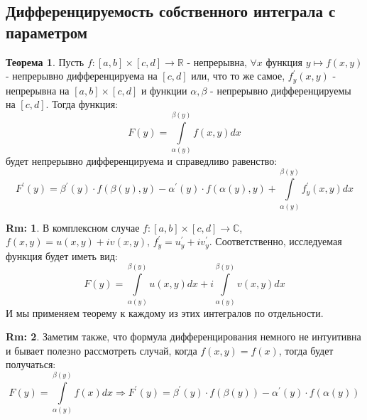 \documentclass[12pt]{article}
\newcommand{\MR}{\mathbb{R}}
\newcommand{\MC}{\mathbb{C}}
\theoremstyle{definition}
\newtheorem{rem}{Rm:}
\newtheorem{theorem}{Теорема}
\newcommand{\ddint}[2]{\displaystyle\int\limits_{#1}^{#2}}
\begin{document}
\subsection*{Дифференцируемость собственного интеграла с параметром}
\begin{theorem}
	Пусть $f\colon [a,b]\times[c,d]\to \MR$ - непрерывна, $\forall x$ функция $y \mapsto f(x,y)$ - непрерывно дифференцируема на $[c,d]$ или, что то же самое, $f_y^\prime(x,y)$ - непрерывна на $[a,b] \times [c,d]$ и функции $\alpha, \beta$ - непрерывно дифференцируемы на $[c,d]$. Тогда функция: 
	$$
		F(y) = \ddint{\alpha(y)}{\beta(y)}f(x,y)dx
	$$
	будет непрерывно дифференцируема и справедливо равенство:
	$$
		F^\prime(y) = \beta^\prime(y) {\cdot}f(\beta(y),y) - \alpha^\prime(y){\cdot}f(\alpha(y),y) + \ddint{\alpha(y)}{\beta(y)}f_y^\prime(x,y)dx
	$$
\end{theorem}
\begin{rem}
	В комплексном случае $f\colon [a,b]\times[c,d]\to \MC$, $f(x,y) = u(x,y) + i v(x,y), \, f_y^\prime = u_y^\prime + i v_y^\prime$. Соответственно, исследуемая функция будет иметь вид:
	$$
		F(y) = \ddint{\alpha(y)}{\beta(y)}u(x,y)dx + i \ddint{\alpha(y)}{\beta(y)}v(x,y)dx
	$$
	И мы применяем теорему к каждому из этих интегралов по отдельности.
\end{rem}
\begin{rem}
	Заметим также, что формула дифференцирования немного не интуитивна и бывает полезно рассмотреть случай, когда $f(x,y) = f(x)$, тогда будет получаться:
	$$
		F(y) = \ddint{\alpha(y)}{\beta(y)}f(x)dx \Rightarrow F^\prime(y) = \beta^\prime(y) {\cdot}f(\beta(y)) - \alpha^\prime(y){\cdot}f(\alpha(y))
	$$
\end{rem}
\end{document}
